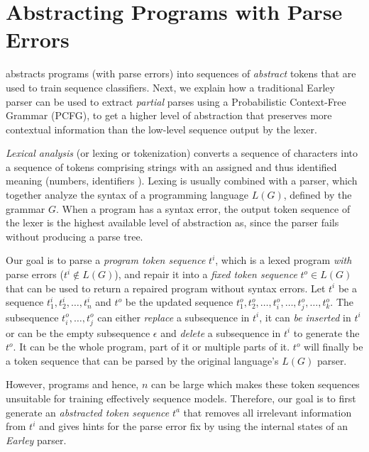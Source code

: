 
\newcommand{\ccount}{\mathit{count}}

\section{Abstracting Programs with Parse Errors}
\label{sec:prog-abstract}

\toolname abstracts programs (with parse errors) into sequences
of \emph{abstract} tokens that are used to train sequence classifiers.
Next, we explain how a traditional Earley parser can be used to extract
\emph{partial} parses using a Probabilistic Context-Free Grammar (PCFG),
to get a higher level of abstraction that preserves more contextual
information than the low-level sequence output by the lexer.



%
\emph{Lexical analysis} (or lexing or tokenization) converts
a sequence of characters into a sequence of tokens comprising
strings with an assigned and thus identified meaning (\eg numbers,
identifiers \etc).
%
Lexing is usually combined with a parser, which together analyze
the syntax of a programming language $L(G)$, defined by the grammar $G$.
%
When a program has a syntax error, the output token sequence of the
lexer is the highest available level of abstraction as, since the
parser fails without producing a parse tree.

%
Our goal is to parse a \emph{program token sequence} $t^i$, which is a lexed
program \emph{with} parse errors (\ie $t^i \notin L(G)$), and repair it into a
\emph{fixed token sequence} $t^o \in L(G)$ that can be used to return a repaired
program without syntax errors. Let $t^i$ be a sequence $t^i_1, t^i_2, \dots,
t^i_n$ and $t^o$ be the updated sequence $t^o_1, t^o_2, \dots, t^o_i, \dots,
t^o_j, \dots, t^o_k$. The subsequence $t^o_i, \dots, t^o_j$ can either
\emph{replace} a subsequence in $t^i$, it can \emph{be inserted} in $t^i$ or can
be the empty subsequence $\epsilon$ and \emph{delete} a subsequence
in $t^i$ to generate the $t^o$. It can be the whole program, part of it or
multiple parts of it. $t^o$ will finally be a token sequence that can be parsed
by the original language's $L(G)$ parser.

However, programs and hence, $n$ can be large which makes these token sequences
unsuitable for training effectively sequence models. Therefore, our goal is to
first generate an \emph{abstracted token sequence} $t^a$ that removes all
irrelevant information from $t^i$ and gives hints for the parse error fix by
using the internal states of an \emph{Earley} parser.


